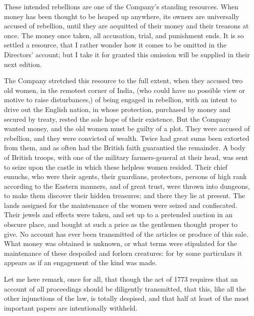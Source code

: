 These intended rebellions are one of the Company's standing resources. When money has been thought to be heaped up anywhere, its owners are universally accused of rebellion, until they are acquitted of their money and their treasons at once. The money once taken, all accusation, trial, and punishment ends. It is so settled a resource, that I rather wonder how it comes to be omitted in the Directors' account; but I take it for granted this omission will be supplied in their next edition.

The Company stretched this resource to the full extent, when they accused two old women, in the remotest corner of India, (who could have no possible view or motive to raise disturbances,) of being engaged in rebellion, with an intent to drive out the English nation, in whose protection, purchased by money and secured by treaty, rested the sole hope of their existence. But the Company wanted money, and the old women must be guilty of a plot. They were accused of rebellion, and they were convicted of wealth. Twice had great sums been extorted from them, and as often had the British faith guarantied the remainder. A body of British troops, with one of the military farmers-general at their head, was sent to seize upon the castle in which these helpless women resided. Their chief eunuchs, who were their agents, their guardians, protectors, persons of high rank according to the Eastern manners, and of great trust, were thrown into dungeons, to make them discover their hidden treasures; and there they lie at present. The lands assigned for the maintenance of the women were seized and confiscated. Their jewels and effects were taken, and set up to a pretended auction in an obscure place, and bought at such a price as the gentlemen thought proper to give. No account has ever been transmitted of the articles or produce of this sale. What money was obtained is unknown, or what terms were stipulated for the maintenance of these despoiled and forlorn creatures: for by some particulars it appears as if an engagement of the kind was made.

Let me here remark, once for all, that though the act of 1773 requires that an account of all proceedings should be diligently transmitted, that this, like all the other injunctions of the law, is totally despised, and that half at least of the most important papers are intentionally withheld.


